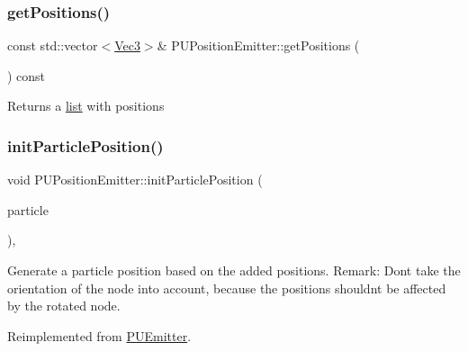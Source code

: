\subsubsection{\texorpdfstring{get\+Positions()}{getPositions()}\hspace{0.1cm}{\footnotesize\ttfamily [2/2]}}
{\footnotesize\ttfamily const std\+::vector$<$\hyperlink{classVec3}{Vec3}$>$\& P\+U\+Position\+Emitter\+::get\+Positions (\begin{DoxyParamCaption}\item[{void}]{ }\end{DoxyParamCaption}) const}

Returns a \hyperlink{protocollist-p}{list} with positions \mbox{\label{classPUPositionEmitter_ab23517a23c156545d99238298b3ac0c6}} 
\subsubsection{\texorpdfstring{init\+Particle\+Position()}{initParticlePosition()}\hspace{0.1cm}{\footnotesize\ttfamily [1/2]}}
{\footnotesize\ttfamily void P\+U\+Position\+Emitter\+::init\+Particle\+Position (\begin{DoxyParamCaption}\item[{\hyperlink{structPUParticle3D}{P\+U\+Particle3D} $\ast$}]{particle }\end{DoxyParamCaption})\hspace{0.3cm}{\ttfamily [override]}, {\ttfamily [virtual]}}

Generate a particle position based on the added positions. Remark\+: Don\textquotesingle{}t take the orientation of the node into account, because the positions shouldn\textquotesingle{}t be affected by the rotated node.

Reimplemented from \hyperlink{classPUEmitter_a2449f31b73c94a55f6559be71d56ca61}{P\+U\+Emitter}.

\mbox{\label{classPUPositionEmitter_a6e2e82f753f3339a4981f3c8d80d1b48}} 
